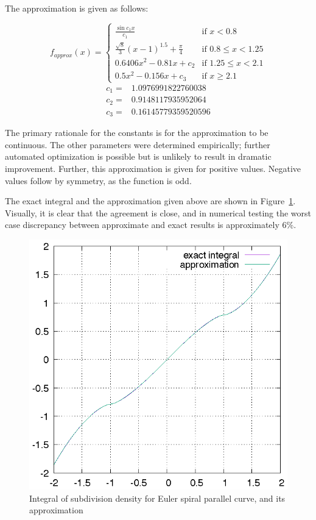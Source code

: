 \documentclass[sigconf, nonacm]{acmart}
\begin{document}
The approximation is given as follows:

\[ 
    f_\mathit{approx}(x) = \left\{
        \begin{array}{rl}
            \frac{\sin c_1 x}{c_1} & \text{if } x < 0.8 \\
            \frac{\sqrt{8}}{3}(x-1)^{1.5} + \frac{\pi}{4} & \text{if } 0.8 \leq x < 1.25 \\
            0.6406x^2 - 0.81x + c_2 & \text{if } 1.25 \leq x < 2.1 \\
            0.5x^2 - 0.156x + c_3 & \text{if } x \geq 2.1
        \end{array}
        \right.
\]
\[
    \begin{array}{ll}
        c_1 = & 1.0976991822760038 \\
        c_2 = & 0.9148117935952064 \\
        c_3 = & 0.16145779359520596
    \end{array}
\]

The primary rationale for the constants is for the approximation to be continuous. The other parameters were determined empirically; further automated optimization is possible but is unlikely to result in dramatic improvement. Further, this approximation is given for positive values. Negative values follow by symmetry, as the function is odd.

The exact integral and the approximation given above are shown in Figure~\ref{fig:espc}. Visually, it is clear that the agreement is close, and in numerical testing the worst case discrepancy between approximate and exact results is approximately 6\%.

\begin{figure}
    \includegraphics[scale=0.8]{espc}
    \caption{Integral of subdivision density for Euler spiral parallel curve, and its approximation}
    \label{fig:espc}
\end{figure}
\end{document}
